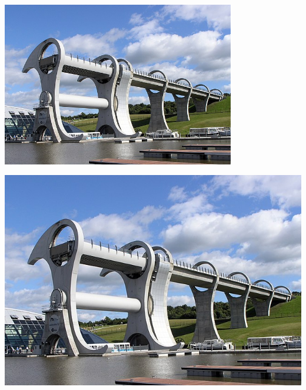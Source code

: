 \documentclass{article}
\begin{document}
	\includegraphics[width=4in]{FalkirkWheel.jpeg}\\
	
	\vspace{2pt}
	\includegraphics[height=4in]{FalkirkWheel.jpeg}
\end{document}
